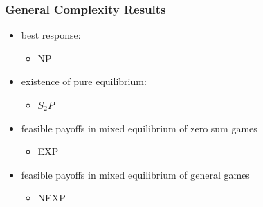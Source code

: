 \documentclass{beamer}
\begin{document}
\begin{frame}
	\frametitle{General Complexity Results}
	\begin{itemize}
		\item best response:
		\begin{itemize}
			\item NP
		\end{itemize}
		\item existence of pure equilibrium:
		\begin{itemize}
			\item $S_2P$
		\end{itemize}
		\item feasible payoffs in mixed equilibrium of zero sum games
		\begin{itemize}
			\item EXP
		\end{itemize}
		\item feasible payoffs in mixed equilibrium of general games
		\begin{itemize}
			\item NEXP
		\end{itemize}
	\end{itemize}
	
\end{frame}
	
\end{document}
